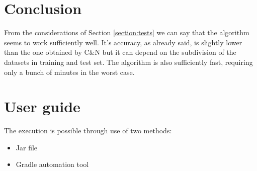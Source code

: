\documentclass{article}
\begin{document}
\newpage


\section{Conclusion}
From the considerations of Section \ref{section:tests} we can say that the algorithm seems to work sufficiently well. It's accuracy, as already said, is slightly lower than the one obtained by C\&N but it can depend on the subdivision of the datasets in training and test set.\newline
The algorithm is also sufficiently fast, requiring only a bunch of minutes in the worst case.

\newpage


\section{User guide}
The execution is possible through use of two methods:
\begin{itemize}
    \item Jar file
    \item Gradle automation tool
\end{itemize}
\end{document}
